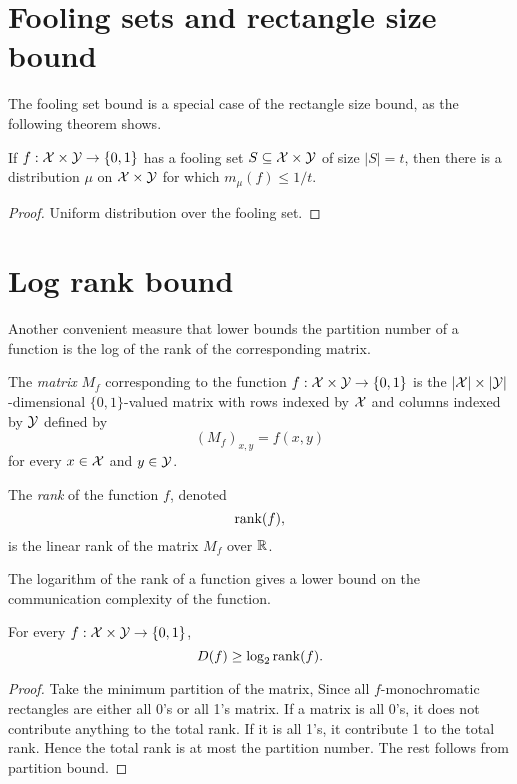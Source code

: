 \newpage \section{Fooling sets and rectangle size bound}

The fooling set bound is a special case of the rectangle size bound, as the following theorem shows.

\begin{theorem}
If $f : \mathcal{X} \times \mathcal{Y} \to \{0,1\}$ has a fooling set $S \subseteq \mathcal{X} \times \mathcal{Y}$ of size $|S| = t$, then there is a distribution $\mu$ on $\mathcal{X} \times \mathcal{Y}$ for which $m_\mu(f) \le 1/t$.
\end{theorem}

\begin{proof}
Uniform distribution over the fooling set.  
\end{proof}


\newpage \section{Log rank bound}

Another convenient measure that lower bounds the partition number of a function is the log of the rank of the corresponding matrix.

\begin{definition}
The \emph{matrix} $M_f$ corresponding to the function $f : \mathcal{X} \times \mathcal{Y} \to \{0,1\}$ is the $|\mathcal{X}| \times |\mathcal{Y}|$-dimensional $\{0,1\}$-valued matrix with rows indexed by $\mathcal{X}$ and columns indexed by $\mathcal{Y}$ defined by
\[
(M_f)_{x,y} = f(x,y)
\]
for every $x \in \mathcal{X}$ and $y \in \mathcal{Y}$.
\end{definition}

\begin{definition}[Rank]
The \emph{rank} of the function $f$, denoted
\[
\mathrm{rank}(f),
\] 
is the linear rank of the matrix $M_f$ over $\mathbb{R}$.
\end{definition}

The logarithm of the rank of a function gives a lower bound on the communication complexity of the function.

\begin{lemma}
\label{lem:logrank}
For every $f : \mathcal{X} \times \mathcal{Y} \to \{0,1\}$,
\[
D(f) \ge \log_2 \mathrm{rank}(f).
\]
\end{lemma}

\begin{proof}
Take the minimum partition of the matrix, Since all $f$-monochromatic rectangles are either all 0's or all 1's matrix. If a matrix is all 0's, it does not contribute anything to the total rank. If it is all 1's, it contribute 1 to the total rank. Hence the total rank is at most the partition number. The rest follows from partition bound. 
\end{proof}

